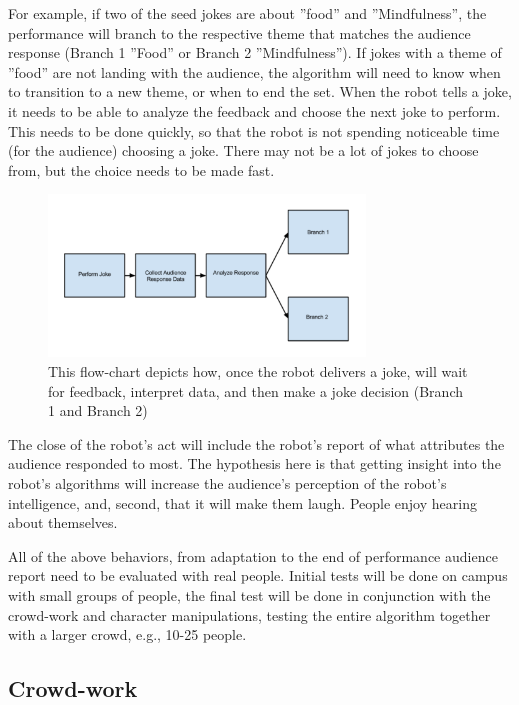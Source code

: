 For example, if two of the seed jokes are about ”food” and ”Mindfulness”, the performance will branch to the
respective theme that matches the audience response (Branch 1 ”Food” or Branch 2 ”Mindfulness”). If jokes with a
theme of ”food” are not landing with the audience, the algorithm will need to know when to transition to a new theme, or when to end the set. When the robot tells a joke, it needs to be able to analyze the feedback and choose the next joke
to perform. This needs to be done quickly, so that the robot is not spending noticeable time (for the audience) choosing
a joke. There may not be a lot of jokes to choose from, but the choice needs to be made fast.

\begin{figure}[H]
  \centering
  \includegraphics[width=0.75\textwidth,height=0.75\textheight,keepaspectratio]{fig1}
  \caption{ This flow-chart depicts how, once the robot delivers a joke, will wait for feedback, interpret data, and then make a joke decision (Branch 1 and Branch 2)}
  \label{fig:process}
\end{figure}

The close of the robot’s act will include the robot’s report of what attributes the audience
responded to most. The hypothesis here is that getting insight into the robot’s algorithms will increase the audience’s
perception of the robot’s intelligence, and, second, that it will make them laugh. People enjoy hearing about themselves.

All of the above behaviors, from adaptation to the end of performance audience report need to be evaluated with
real people. Initial tests will be done on campus with small groups of people, the final test will be done in conjunction
with the crowd-work and character manipulations, testing the entire algorithm together with a larger crowd, e.g., 10-25
people.


\subsection{Crowd-work}
